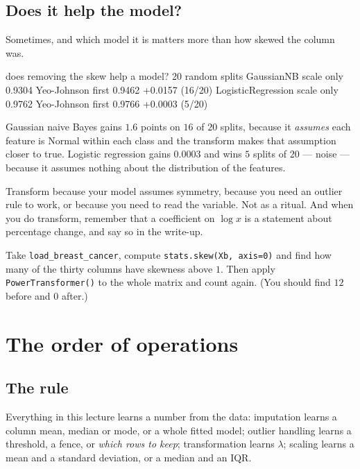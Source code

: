 \documentclass[11pt]{article}
\begin{document}
\subsection{Does it help the model?}

Sometimes, and which model it is matters more than how skewed the column was.

\begin{codeout}
does removing the skew help a model? 20 random splits
  GaussianNB           scale only 0.9304   Yeo-Johnson first 0.9462   +0.0157  (16/20)
  LogisticRegression   scale only 0.9762   Yeo-Johnson first 0.9766   +0.0003  (5/20)
\end{codeout}

Gaussian naive Bayes gains $1.6$ points on $16$ of $20$ splits, because it
\emph{assumes} each feature is Normal within each class and the transform makes
that assumption closer to true. Logistic regression gains $0.0003$ and wins $5$
splits of $20$ --- noise --- because it assumes nothing about the distribution
of the features.

\begin{keyidea}
Transform because your model assumes symmetry, because you need an outlier rule
to work, or because you need to read the variable. Not as a ritual. And when
you do transform, remember that a coefficient on $\log x$ is a statement about
percentage change, and say so in the write-up.
\end{keyidea}

\begin{tryit}
Take \texttt{load\_breast\_cancer}, compute
\texttt{stats.skew(Xb, axis=0)} and find how many of the thirty columns have
skewness above $1$. Then apply \texttt{PowerTransformer()} to the whole matrix
and count again. (You should find $12$ before and $0$ after.)
\end{tryit}

\section{The order of operations}
\label{sec:leak}

\subsection{The rule}

Everything in this lecture learns a number from the data: imputation learns a
column mean, median or mode, or a whole fitted model; outlier handling learns a
threshold, a fence, or \emph{which rows to keep}; transformation learns
$\lambda$; scaling learns a mean and a standard deviation, or a median and an
IQR.
\end{document}
